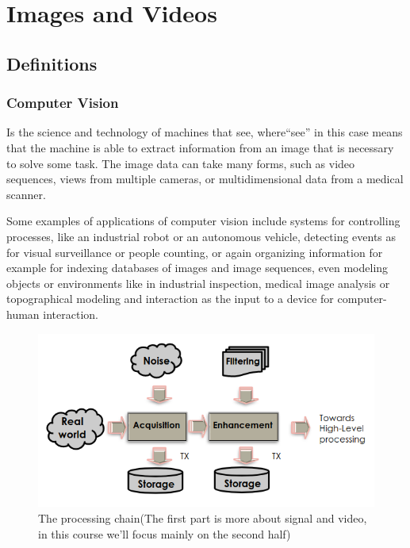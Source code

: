 
\chapter{Images and Videos}

\section{Definitions}
\subsection{Computer Vision}
Is the science and technology of machines that see, where“see” in this case means that the machine is able to extract information from an image that is necessary to solve some task. The image data can take many forms, such as video sequences, views from multiple cameras, or multidimensional data from a medical scanner.

Some examples of applications of computer vision include systems for controlling processes, like an industrial robot or an autonomous vehicle, detecting events as for visual surveillance or people counting, or again organizing information for example for indexing databases of images and image sequences, even modeling objects or environments like in industrial inspection, medical image analysis or topographical modeling and interaction as the input to a device for computer-human interaction.

\begin{figure}[h]
    \centering
    \includegraphics[scale=0.5]{Figures/ProcessingChain.png}
    \caption{The processing chain(The first part is more about signal and video, in this course we'll focus mainly on the second half)}
    \label{fig:enter-label}
\end{figure}

